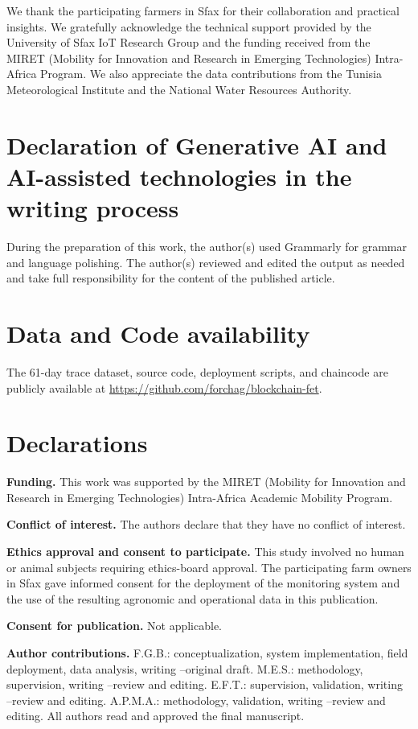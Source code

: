 \documentclass[pdflatex,sn-mathphys-num]{sn-jnl}
\theoremstyle{thmstyleone}
\theoremstyle{thmstyletwo}
\theoremstyle{thmstylethree}
\begin{document}
We thank the participating farmers in Sfax for their collaboration and practical insights. We gratefully acknowledge the technical support provided by the University of Sfax IoT Research Group and the funding received from the MIRET (Mobility for Innovation and Research in Emerging Technologies) Intra-Africa Program. We also appreciate the data contributions from the Tunisia Meteorological Institute and the National Water Resources Authority.

\section*{Declaration of Generative AI and AI-assisted technologies in the writing process}

During the preparation of this work, the author(s) used Grammarly for grammar and language polishing. The author(s) reviewed and edited the output as needed and take full responsibility for the content of the published article.

\section*{Data and Code availability}

The 61-day trace dataset, source code, deployment scripts, and chaincode are publicly available at \url{https://github.com/forchag/blockchain-fet}.

\section*{Declarations}

\textbf{Funding.} This work was supported by the MIRET (Mobility for Innovation and Research in Emerging Technologies) Intra-Africa Academic Mobility Program.

\noindent\textbf{Conflict of interest.} The authors declare that they have no conflict of interest.

\noindent\textbf{Ethics approval and consent to participate.} This study involved no human or animal subjects requiring ethics-board approval. The participating farm owners in Sfax gave informed consent for the deployment of the monitoring system and the use of the resulting agronomic and operational data in this publication.

\noindent\textbf{Consent for publication.} Not applicable.

\noindent\textbf{Author contributions.} F.G.B.: conceptualization, system implementation, field deployment, data analysis, writing --original draft. M.E.S.: methodology, supervision, writing --review and editing. E.F.T.: supervision, validation, writing --review and editing. A.P.M.A.: methodology, validation, writing --review and editing. All authors read and approved the final manuscript.

\FloatBarrier

\end{document}

